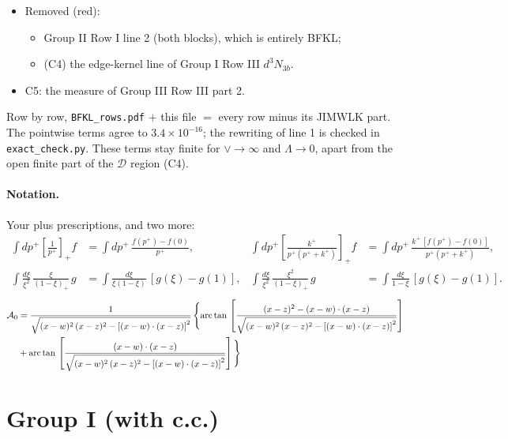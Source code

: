 \documentclass[10pt]{article}
\numberwithin{equation}{section}
\newcommand{\old}[1]{{\color{red}#1}}
\begin{document}
\begin{itemize}
\begin{itemize}
\item the limits of the plus-prescribed integrals;
\item $\frac{1}{k^++\Lambda}\to\frac{1}{k^+}$, $\frac{k^+}{k^++\Lambda}\to1$, $2\log(1-\frac{\Lambda}{k^+})\to0$.
\end{itemize}
\item Removed (\old{red}):
\begin{itemize}
\item Group II Row I line 2 (both blocks), which is entirely BFKL;
\item (C4) the edge-kernel line of Group I Row III $d^3N_{3b}$.
\end{itemize}
\item C5: the measure of Group III Row III part 2.
\end{itemize}
Row by row, \texttt{BFKL\_rows.pdf} $+$ this file $=$ every row minus its JIMWLK part. The pointwise terms agree to $3.4\times10^{-16}$; the rewriting of line 1 is checked in \texttt{exact\_check.py}. These terms stay finite for $\vee\to\infty$ and $\Lambda\to0$, apart from the open finite part of the $\mathcal D$ region (C4).
\paragraph{Notation.} Your plus prescriptions, and two more:
\begin{align*}
\int dp^+\left[\frac{1}{p^+}\right]_+f&=\int dp^+\,\frac{f(p^+)-f(0)}{p^+},&
\int dp^+\left[\frac{k^+}{p^+(p^++k^+)}\right]_+f&=\int dp^+\,\frac{k^+\,[f(p^+)-f(0)]}{p^+(p^++k^+)},\\
\int\frac{d\xi}{\xi^2}\,\frac{\xi}{(1-\xi)_+}\,g&=\int\frac{d\xi}{\xi(1-\xi)}\,[g(\xi)-g(1)],&
\int\frac{d\xi}{\xi^2}\,\frac{\xi^2}{(1-\xi)_+}\,g&=\int\frac{d\xi}{1-\xi}\,[g(\xi)-g(1)].
\end{align*}
\begin{align}
\mathcal{A}_{0} & = \frac{1}{\sqrt{(x-w)^{2}\,(x-z)^{2}-\left[(x-w)\cdot (x-z)\right]^{2}}}\, \Bigg\{\mathrm{arc\,tan}\,\left[\frac{(x-z)^{2}-(x-w)\cdot (x-z)}{\sqrt{(x-w)^{2}\,(x-z)^{2}-\left[(x-w)\cdot (x-z)\right]^{2}}}\right]\notag \\ & + \mathrm{arc\,tan}\,\left[\frac{(x-w)\cdot (x-z)}{\sqrt{(x-w)^{2}\,(x-z)^{2}-\left[(x-w)\cdot (x-z)\right]^{2}}}\right] \Bigg\}
\label{eq:A0}
\end{align}

\section{Group I (with c.c.)}\label{sec:FgI}
\end{document}
